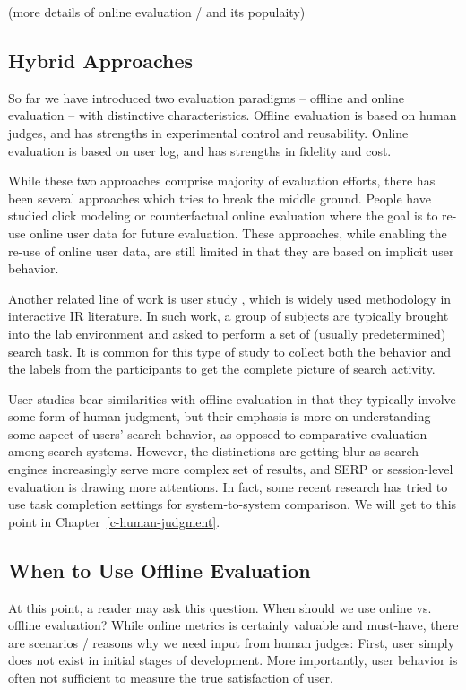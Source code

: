 \documentclass[openany]{now} %
\begin{document}
(more details of online evaluation / and its populaity)

\subsection{Hybrid Approaches}

So far we have introduced two evaluation paradigms -- offline and online evaluation -- with distinctive characteristics. Offline evaluation is based on human judges, and has strengths in experimental control and reusability. Online evaluation is based on user log, and has strengths in fidelity and cost.

While these two approaches comprise majority of evaluation efforts, there has been several approaches which tries to break the middle ground. People have studied click modeling \cite{chuklin2015click} or counterfactual online evaluation \cite{Li:2015, li2010contextual} where the goal is to re-use online user data for future evaluation. These approaches, while enabling the re-use of online user data, are still limited in that they are based on implicit user behavior.

Another related line of work is user study \cite{Bron:2013, Liu:2014, Shah:2011}, which is widely used methodology in interactive IR \cite{kelly2009methods} literature. In such work, a group of subjects are typically brought into the lab environment and asked to perform a set of (usually predetermined) search task. It is common for this type of study to collect both the behavior and the labels from the participants to get the complete picture of search activity. 

User studies bear similarities with offline evaluation in that they typically involve some form of human judgment, but their emphasis is more on understanding some aspect of users' search behavior, as opposed to comparative evaluation among search systems. However, the distinctions are getting blur as search engines increasingly serve more complex set of results, and SERP or session-level evaluation is drawing more attentions. In fact, some recent research \cite{Xu:2009} has tried to use task completion settings for system-to-system comparison. We will get to this point in Chapter~\ref{c-human-judgment}.

\subsection{When to Use Offline Evaluation}

At this point, a reader may ask this question. When should we use online vs. offline evaluation? While online metrics is certainly valuable and must-have, there are scenarios / reasons why we need input from human judges: First, user simply does not exist in initial stages of development. More importantly, user behavior is often not sufficient to measure the true satisfaction of user. 
\end{document}
